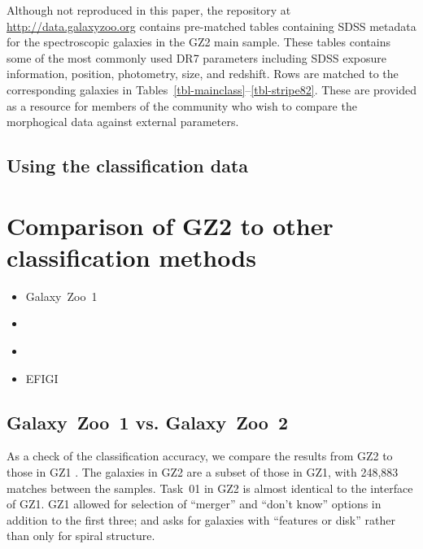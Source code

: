 \documentclass[useAMS,usenatbib]{mn2e}
\begin{document}
Although not reproduced in this paper, the repository at \url{http://data.galaxyzoo.org} contains pre-matched tables containing SDSS metadata for the spectroscopic galaxies in the GZ2 main sample. These tables contains some of the most commonly used DR7 parameters including SDSS exposure information, position, photometry, size, and redshift. Rows are matched to the corresponding galaxies in Tables~\ref{tbl-mainclass}--\ref{tbl-stripe82}. These are provided as a resource for members of the community who wish to compare the morphogical data against external parameters. 

\subsection{Using the classification data}\label{ssec-usingdata}


\section{Comparison of GZ2 to other classification methods}\label{sec-comparison}

\begin{itemize}
	\item Galaxy~Zoo~1 \citep{lin11}
	\item \citet{nai10}
	\item \citet{hue11}
	\item EFIGI \citep{bai11}
\end{itemize}


\subsection{Galaxy~Zoo~1 vs. Galaxy~Zoo~2}

As a check of the classification accuracy, we compare the results from GZ2 to those in GZ1 \citep{lin11}. The galaxies in GZ2 are a subset of those in GZ1, with 248,883 matches between the samples. Task~01 in GZ2 is almost identical to the interface of GZ1. GZ1 allowed for selection of ``merger'' and ``don't know'' options in addition to the first three; and asks for galaxies with ``features or disk'' rather than only for spiral structure. 
\end{document}
